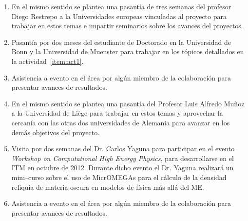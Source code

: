 \begin{enumerate}
\item En el mismo sentido se plantea una pasantía de tres semanas del
  profesor Diego Restrepo a la Universidades europeas vinculadas al
  proyecto para trabajar en estos temas e impartir seminarios sobre
  los avances del proyectos. 
  \label{item:act5}

\item Pasantía por dos meses del estudiante de Doctorado en la
  Universidad de Bonn y la Universidad de Muenster para trabajar en
  los tópicos detallados en la actividad~\ref{item:act1}.
  \label{item:act6}
\item Asistencia a evento en el área por algún miembro de la
  colaboración para presentar avances de resultados.

\item En el mismo sentido se plantea una pasantía del Profesor Luis
  Alfredo Muñoz a la Universidad de Liège para trabajar en estos temas y
  aprovechar la cercanía con las otras dos universidades de Alemania
  para avanzar en los demás objetivos del proyecto.
  \label{item:act8}
\item Visita por dos semanas del Dr. Carlos Yaguna para participar en
  el evento \emph{Workshop on Computational High Energy Physics}, para
  desarrollarse en el ITM en octubre de 2012. Durante dicho evento el
  Dr. Yaguna realizará un mini--curso sobre el uso de MicrOMEGAs para
  el cálculo de la densidad reliquia de materia oscura en modelos de física
  más allá del ME.
  \label{item:act9}
\item Asistencia a evento en el área por algún miembro de la
  colaboración para presentar avances de resultados.
\end{enumerate}





